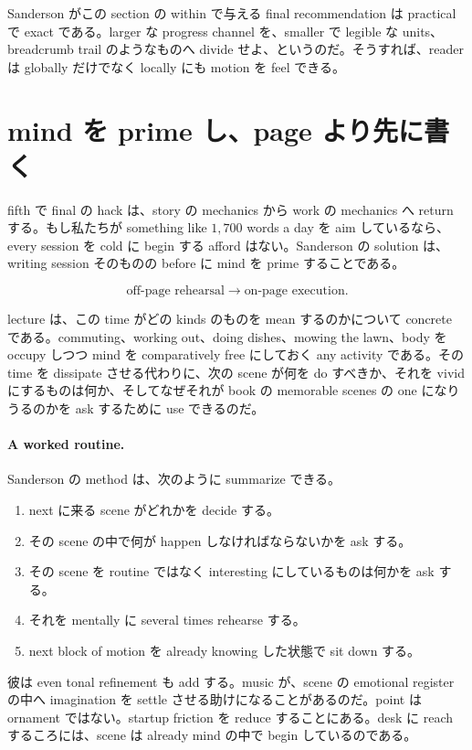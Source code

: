 Sanderson がこの section の within で与える final recommendation は practical で exact である。larger な progress channel を、smaller で legible な units、breadcrumb trail のようなものへ divide せよ、というのだ。そうすれば、reader は globally だけでなく locally にも motion を feel できる。

\section{mind を prime し、page より先に書く}

fifth で final の hack は、story の mechanics から work の mechanics へ return する。もし私たちが something like \(1{,}700\) words a day を aim しているなら、every session を cold に begin する afford はない。Sanderson の solution は、writing session そのものの before に mind を prime することである。

\begin{equation}
\text{off-page rehearsal} \to \text{on-page execution}.
\end{equation}

lecture は、この time がどの kinds のものを mean するのかについて concrete である。commuting、working out、doing dishes、mowing the lawn、body を occupy しつつ mind を comparatively free にしておく any activity である。その time を dissipate させる代わりに、次の scene が何を do すべきか、それを vivid にするものは何か、そしてなぜそれが book の memorable scenes の one になりうるのかを ask するために use できるのだ。

\paragraph{A worked routine.} Sanderson の method は、次のように summarize できる。
\begin{enumerate}
\item next に来る scene がどれかを decide する。
\item その scene の中で何が happen しなければならないかを ask する。
\item その scene を routine ではなく interesting にしているものは何かを ask する。
\item それを mentally に several times rehearse する。
\item next block of motion を already knowing した状態で sit down する。
\end{enumerate}

彼は even tonal refinement も add する。music が、scene の emotional register の中へ imagination を settle させる助けになることがあるのだ。point は ornament ではない。startup friction を reduce することにある。desk に reach するころには、scene は already mind の中で begin しているのである。

